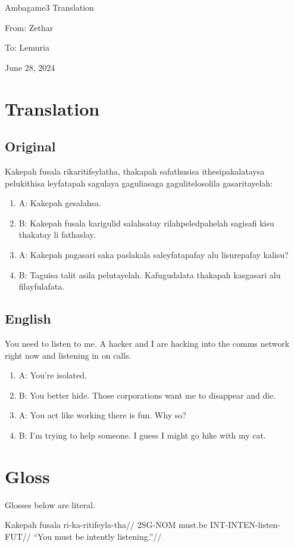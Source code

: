 \documentclass{thiguka}
\begin{document}
Ambagame3 Translation

From: Zethar

To: Lemuria

June 28, 2024


\section{Translation}

\subsection{Original}
Kakepah fusala rikaritifeylatha, thakapah safathusisa ithesipakalataysa pelukithisa leyfatapah sagulaya gaguliasaga gagulitelosolila gasaritayelah:

\begin{enumerate}
\item A: Kakepah gesalahsa.
\item B: Kakepah fusala karigulid salahsatay rilahpeledpahelah sagisafi kisu thakatay li fathaslay.
\item A: Kakepah pagasari saka paslakala saleyfatapafay alu lisurepafay kalisu?
\item B: Taguisa talit asila pelutayelah. Kafugudalata thakapah kasgasari alu filayfulafata.
\end{enumerate}

\subsection{English}
You need to listen to me. A hacker and I are hacking into the comms network right now and listening in on calls.

\begin{enumerate}
\item A: You're isolated.
\item B: You better hide. Those corporations want me to disappear and die.
\item A: You act like working there is fun. Why so?
\item B: I'm trying to help someone. I guess I might go hike with my cat.
\end{enumerate}

\section{Gloss}
Glosses below are literal.

\ex
\begingl
\gla  Kakepah fusala ri-ka-ritifeyla-tha//
\glb  2SG-NOM must.be INT-INTEN-listen-FUT//
\glft ``You must be intently listening.''//
\endgl
\xe
\end{document}
